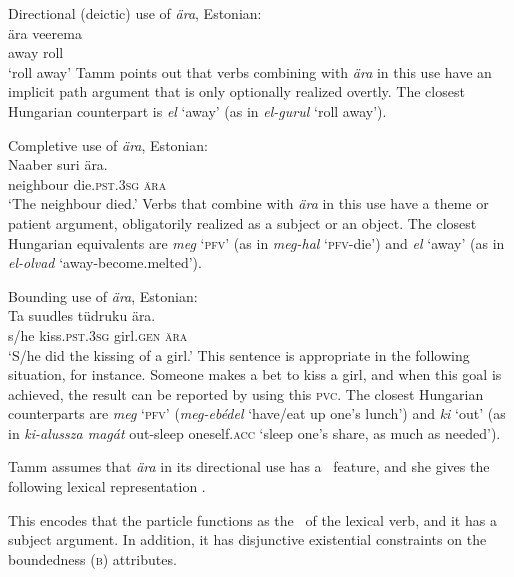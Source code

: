 \documentclass[output=paper,hidelinks]{langscibook}
\begin{document}
\ea%
\label{ex:FinnoUgric:9}Directional (deictic) use of \textit{ära}, Estonian:\\
    \gll ära veerema\\
    away roll    \\
    \glt `roll away'
\z
Tamm points out that verbs combining with \textit{ära} in this use have an implicit path argument that is only optionally realized overtly. The closest Hungarian counterpart is \textit{el} `away' (as in \textit{el-gurul} `roll away').

\ea%
    \label{ex:FinnoUgric:10}Completive use of \textit{ära}, Estonian:\\
    \gll Naaber suri ära.\\
       neighbour die.\textsc{pst.}3\textsc{sg} \textsc{ära} \\
    \glt `The neighbour died.'
    \z
Verbs that combine with \textit{ära} in this use have a theme or patient argument, obligatorily realized as a subject or an object. The closest Hungarian equivalents are \textit{meg} `\textsc{pfv}' (as in \textit{meg-hal} `\textsc{pfv}{}-die') and \textit{el} `away' (as in \textit{el-olvad} `away-become.mel\-ted').

\ea%
    \label{ex:FinnoUgric:11} Bounding use of \textit{ära}, Estonian:\\
    \gll Ta suudles tüdruku ära.\\
     s/he kiss.\textsc{pst.}3\textsc{sg} girl.\textsc{gen} \textsc{ära}\\
    \glt `S/he did the kissing of a girl.'
    \z
This sentence is appropriate in the following situation, for instance. Someone makes a bet to kiss a girl, and when this goal is achieved, the result can be reported by using this \textsc{pvc}. The closest Hungarian counterparts are \textit{meg} `\textsc{pfv}' (\textit{meg-ebédel} `have/eat up one's lunch') and \textit{ki} `out' (as in \textit{ki-alussza magát} out-sleep oneself.\textsc{acc} `sleep one's share, as much as needed').

Tamm assumes that \textit{ära} in its directional use has a \PRED\ feature, and she gives the following lexical representation \citep[231]{Tamm2004a}.

\ea%
    \label{ex:FinnoUgric:12}
\z
This encodes that the particle functions as the \PRED\ of the lexical verb, and it has a subject argument. In addition, it has disjunctive existential constraints on the boundedness (\textsc{b}) attributes.
\end{document}
